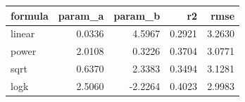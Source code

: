 \begin{tabular}{lrrrr}
\toprule
formula & param\_a & param\_b & r2 & rmse \\
\midrule
linear & 0.0336 & 4.5967 & 0.2921 & 3.2630 \\
power & 2.0108 & 0.3226 & 0.3704 & 3.0771 \\
sqrt & 0.6370 & 2.3383 & 0.3494 & 3.1281 \\
logk & 2.5060 & -2.2264 & 0.4023 & 2.9983 \\
\bottomrule
\end{tabular}
